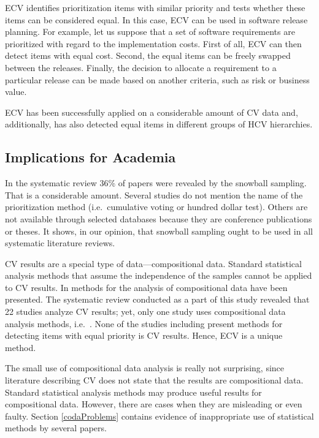 ECV identifies prioritization items with similar priority and tests whether these items can be considered equal.
In this case, ECV can be used in software release planning.
For example, let us suppose that a set of software requirements are prioritized with regard to the implementation costs.
First of all, ECV can then detect items with equal cost.
Second, the equal items can be freely swapped between the releases.
Finally, the decision to allocate a requirement to a particular release can be made based on another criteria, such as risk or business value.

ECV has been successfully applied on a considerable amount of CV data and, additionally, has also detected equal items in different groups of HCV hierarchies.

\subsection{Implications for Academia}
In the systematic review 36\% of papers were revealed by the snowball sampling.
That is a considerable amount.
Several studies do not mention the name of the prioritization method (i.e.\ cumulative voting or hundred dollar test).
Others are not available through selected databases because they are conference publications or theses.
It shows, in our opinion, that snowball sampling ought to be used in all systematic literature reviews.

CV results are a special type of data---compositional data.
Standard statistical analysis methods that assume the independence of the samples cannot be applied to CV results.
In \citep{Aitchison1986} methods for the analysis of compositional data have been presented.
The systematic review conducted as a part of this study revealed that 22 studies analyze CV results; yet, only one study uses compositional data analysis methods, i.e.\ \citep{Chatzipetrou2010}.%
None of the studies including \citep{Chatzipetrou2010} present methods for detecting items with equal priority is CV results. Hence, ECV is a unique method.

The small use of compositional data analysis is really not surprising, since literature describing CV does not state that the results are compositional data.
Standard statistical analysis methods may produce useful results for compositional data.
However, there are cases when they are misleading or even faulty.
Section \ref{codaProblems} contains evidence of inappropriate use of statistical methods by several papers.


